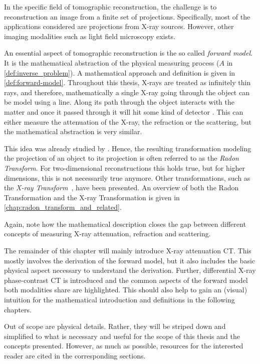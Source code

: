 In the specific field of tomographic reconstruction, the challenge is to reconstruction an image
from a finite set of projections. Specifically, most of the applications considered are projections
from X-ray sources. However, other imaging modalities such as light field microscopy exists.

An essential aspect of tomographic reconstruction is the so called \textit{forward model}. It is the
mathematical abstraction of the physical measuring process (\(A\) in \autoref{def:inverse_problem}).
A mathematical approach and definition is given in \autoref{def:forward-model}. Throughout this
thesis, X-rays are treated as infinitely thin rays, and therefore, mathematically a single X-ray
going through the object can be model using a line. Along its path through the object interacts with
the matter and once it passed through it will hit some kind of detector . This can either measure
the attenuation of the X-ray, the refraction or the scattering, but the mathematical abstraction is
very similar.

This idea was already studied by \citeauthor{radon_uber_1917}. Hence, the resulting transformation
modeling the projection of an object to its projection is often referred to as the \textit{Radon
	Transform}. For two-dimensional reconstructions this holds true, but for higher dimensions,
this is not necessarily true anymore. Other transformations, such as the \textit{X-ray
	Transform}~\cite{solmon_x-ray_1976}, have been presented. An overview of both the Radon
Transformation and the X-ray Transformation is given in \autoref{chap:radon_transform_and_related}.

Again, note how the mathematical description closes the gap between different concepts of
measuring X-ray attenuation, refraction and scattering.

The remainder of this chapter will mainly introduce X-ray attenuation CT. This mostly involves the
derivation of the forward model, but it also includes the basic physical aspect necessary to
understand the derivation. Further, differential X-ray phase-contrast CT is introduced and the
common aspects of the forward model both modalities share are highlighted. This should also help to
gain an (visual) intuition for the mathematical introduction and definitions in the following
chapters.

Out of scope are physical details. Rather, they will be striped down and simplified to what is
necessary and useful for the scope of this thesis and the concepts presented. However, as much as
possible, resources for the interested reader are cited in the corresponding sections.

